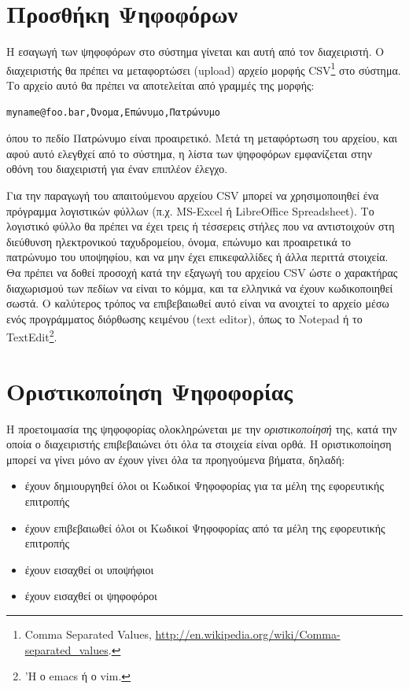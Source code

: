 \documentclass{tufte-handout}
\begin{document}
\section{Προσθήκη Ψηφοφόρων}

Η εσαγωγή των ψηφοφόρων στο σύστημα γίνεται και αυτή από τον
διαχειριστή. Ο διαχειριστής θα πρέπει να μεταφορτώσει (upload) αρχείο
μορφής CSV\footnote{Comma Separated Values,
  \url{http://en.wikipedia.org/wiki/Comma-separated_values}.} στο
σύστημα. Το αρχείο αυτό θα πρέπει να αποτελείται από γραμμές της
μορφής:
\begin{verbatim}
myname@foo.bar,Όνομα,Επώνυμο,Πατρώνυμο
\end{verbatim}
όπου το πεδίο Πατρώνυμο είναι προαιρετικό. Μετά τη μεταφόρτωση του
αρχείου, και αφού αυτό ελεγθχεί από το σύστημα, η λίστα των ψηφοφόρων
εμφανίζεται στην οθόνη του διαχειριστή για έναν επιπλέον έλεγχο.

Για την παραγωγή του απαιτούμενου αρχείου CSV μπορεί να χρησιμοποιηθεί
ένα πρόγραμμα λογιστικών φύλλων (π.χ. MS-Excel ή LibreOffice
Spreadsheet). Το λογιστικό φύλλο θα πρέπει να έχει τρεις ή τέσσερεις
στήλες που να αντιστοιχούν στη διεύθυνση ηλεκτρονικού ταχυδρομείου,
όνομα, επώνυμο και προαιρετικά το πατρώνυμο του υποψηφίου, και να μην
έχει επικεφαλλίδες ή άλλα περιττά στοιχεία. Θα πρέπει να δοθεί προσοχή
κατά την εξαγωγή του αρχείου CSV ώστε ο χαρακτήρας διαχωρισμού των
πεδίων να είναι το κόμμα, και τα ελληνικά να έχουν κωδικοποιηθεί
σωστά. Ο καλύτερος τρόπος να επιβεβαιωθεί αυτό είναι να ανοιχτεί το
αρχείο μέσω ενός προγράμματος διόρθωσης κειμένου (text editor), όπως
το Notepad ή το TextEdit\footnote{'Η ο emacs ή ο vim.}.

\section{Οριστικοποίηση Ψηφοφορίας}

Η προετοιμασία της ψηφοφορίας ολοκληρώνεται με την
\emph{οριστικοποίησή} της, κατά την οποία ο διαχειριστής επιβεβαιώνει
ότι όλα τα στοιχεία είναι ορθά. Η οριστικοποίηση μπορεί να γίνει μόνο
αν έχουν γίνει όλα τα προηγούμενα βήματα, δηλαδή:

\begin{itemize}
\item έχουν δημιουργηθεί όλοι οι Κωδικοί Ψηφοφορίας για τα μέλη της
  εφορευτικής επιτροπής
\item έχουν επιβεβαιωθεί όλοι οι Κωδικοί Ψηφοφορίας από τα μέλη της
  εφορευτικής επιτροπής
\item έχουν εισαχθεί οι υποψήφιοι
\item έχουν εισαχθεί οι ψηφοφόροι
\end{itemize}
\end{document}
